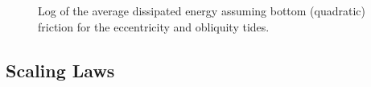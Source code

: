 \begin{figure}[!t]
\begin{subfigure}{0.48\linewidth}
\subcaption{\label{fig:bottomFricObliq}}
\end{subfigure}
\vspace*{-0.8cm}
\caption{Log of the average dissipated energy assuming bottom (quadratic) friction for the eccentricity and obliquity tides. \label{fig:bottomFric}}
\end{figure}

\subsection{Scaling Laws \label{subsec:scaling}}